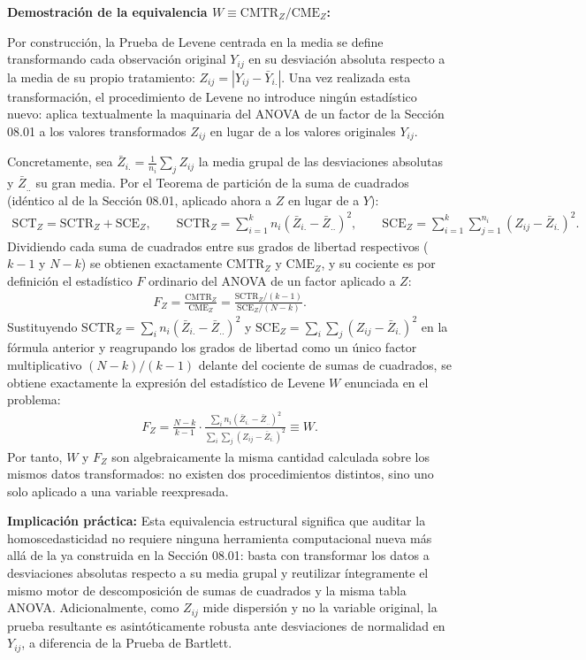 \begin{solproblema}
	\textbf{Demostración de la equivalencia $W \equiv \text{CMTR}_Z/\text{CME}_Z$:}

	Por construcción, la Prueba de Levene centrada en la media se define transformando cada observación original $Y_{ij}$ en su desviación absoluta respecto a la media de su propio tratamiento: $Z_{ij} = |Y_{ij} - \bar{Y}_{i.}|$. Una vez realizada esta transformación, el procedimiento de Levene no introduce ningún estadístico nuevo: aplica textualmente la maquinaria del ANOVA de un factor de la Sección 08.01 a los valores transformados $Z_{ij}$ en lugar de a los valores originales $Y_{ij}$.

	Concretamente, sea $\bar{Z}_{i.} = \frac{1}{n_i}\sum_j Z_{ij}$ la media grupal de las desviaciones absolutas y $\bar{Z}_{..}$ su gran media. Por el Teorema de partición de la suma de cuadrados (idéntico al de la Sección 08.01, aplicado ahora a $Z$ en lugar de a $Y$):
	\begin{align}
		\text{SCT}_Z = \text{SCTR}_Z + \text{SCE}_Z, \qquad \text{SCTR}_Z = \sum_{i=1}^k n_i(\bar{Z}_{i.}-\bar{Z}_{..})^2, \qquad \text{SCE}_Z = \sum_{i=1}^k \sum_{j=1}^{n_i}(Z_{ij}-\bar{Z}_{i.})^2.
	\end{align}
	Dividiendo cada suma de cuadrados entre sus grados de libertad respectivos ($k-1$ y $N-k$) se obtienen exactamente $\text{CMTR}_Z$ y $\text{CME}_Z$, y su cociente es por definición el estadístico $F$ ordinario del ANOVA de un factor aplicado a $Z$:
	\begin{align}
		F_Z = \frac{\text{CMTR}_Z}{\text{CME}_Z} = \frac{\text{SCTR}_Z/(k-1)}{\text{SCE}_Z/(N-k)}.
	\end{align}
	Sustituyendo $\text{SCTR}_Z = \sum_i n_i(\bar{Z}_{i.}-\bar{Z}_{..})^2$ y $\text{SCE}_Z = \sum_i\sum_j (Z_{ij}-\bar{Z}_{i.})^2$ en la fórmula anterior y reagrupando los grados de libertad como un único factor multiplicativo $(N-k)/(k-1)$ delante del cociente de sumas de cuadrados, se obtiene exactamente la expresión del estadístico de Levene $W$ enunciada en el problema:
	\begin{align}
		F_Z = \frac{N-k}{k-1}\cdot\frac{\sum_i n_i(\bar{Z}_{i.}-\bar{Z}_{..})^2}{\sum_i\sum_j (Z_{ij}-\bar{Z}_{i.})^2} \equiv W.
	\end{align}
	Por tanto, $W$ y $F_Z$ son algebraicamente la misma cantidad calculada sobre los mismos datos transformados: no existen dos procedimientos distintos, sino uno solo aplicado a una variable reexpresada.

	\textbf{Implicación práctica:} Esta equivalencia estructural significa que auditar la homoscedasticidad no requiere ninguna herramienta computacional nueva más allá de la ya construida en la Sección 08.01: basta con transformar los datos a desviaciones absolutas respecto a su media grupal y reutilizar íntegramente el mismo motor de descomposición de sumas de cuadrados y la misma tabla ANOVA. Adicionalmente, como $Z_{ij}$ mide dispersión y no la variable original, la prueba resultante es asintóticamente robusta ante desviaciones de normalidad en $Y_{ij}$, a diferencia de la Prueba de Bartlett.
\end{solproblema}
